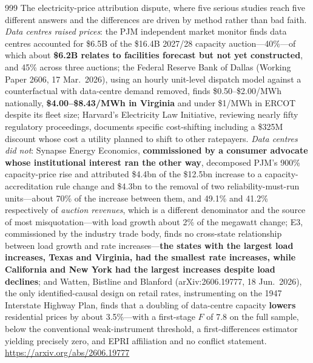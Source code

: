 \begin{thebibliography}{999}
 The electricity-price attribution dispute, where five serious studies reach five different answers and the differences are driven by method rather than bad faith. \emph{Data centres raised prices}: the PJM independent market monitor finds data centres accounted for \$6.5B of the \$16.4B 2027/28 capacity auction---40\%---of which about \textbf{\$6.2B relates to facilities forecast but not yet constructed}, and 45\% across three auctions; the Federal Reserve Bank of Dallas (Working Paper 2606, 17 Mar.\ 2026), using an hourly unit-level dispatch model against a counterfactual with data-centre demand removed, finds \$0.50--\$2.00/MWh nationally, \textbf{\$4.00--\$8.43/MWh in Virginia} and under \$1/MWh in ERCOT despite its fleet size; Harvard's Electricity Law Initiative, reviewing nearly fifty regulatory proceedings, documents specific cost-shifting including a \$325M discount whose cost a utility planned to shift to other ratepayers. \emph{Data centres did not}: Synapse Energy Economics, \textbf{commissioned by a consumer advocate whose institutional interest ran the other way}, decomposed PJM's 900\% capacity-price rise and attributed \$4.4bn of the \$12.5bn increase to a capacity-accreditation rule change and \$4.3bn to the removal of two reliability-must-run units---about 70\% of the increase between them, and 49.1\% and 41.2\% respectively of \emph{auction revenues}, which is a different denominator and the source of most misquotation---with load growth about 2\% of the megawatt change; E3, commissioned by the industry trade body, finds no cross-state relationship between load growth and rate increases---\textbf{the states with the largest load increases, Texas and Virginia, had the smallest rate increases, while California and New York had the largest increases despite load declines}; and Watten, Bistline and Blanford (arXiv:2606.19777, 18 Jun.\ 2026), the only identified-causal design on retail rates, instrumenting on the 1947 Interstate Highway Plan, finds that a doubling of data-centre capacity \textbf{lowers} residential prices by about 3.5\%---with a first-stage $F$ of 7.8 on the full sample, below the conventional weak-instrument threshold, a first-differences estimator yielding precisely zero, and EPRI affiliation and no conflict statement. \url{https://arxiv.org/abs/2606.19777}


\end{thebibliography}

